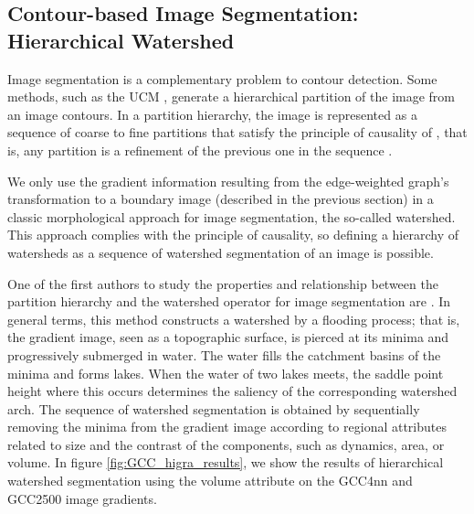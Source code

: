 \subsection{Contour-based Image Segmentation: Hierarchical Watershed}

Image segmentation is a complementary problem to contour detection. Some methods, such as the UCM \citep{Arbelaez.Maire.ea:PR:2009}, generate a hierarchical partition of the image from an image contours. In a partition hierarchy, the image is represented as a sequence of coarse to fine partitions that satisfy the principle of causality of \cite{Koenderink:BC:1984}, that is, any partition is a refinement of the previous one in the sequence \citep{Perret.Cousty.ea:TIP:2018}.

We only use the gradient information resulting from the edge-weighted graph's transformation to a boundary image (described in the previous section) in a classic morphological approach for image segmentation, the so-called watershed. This approach complies with the principle of causality, so defining a hierarchy of watersheds as a sequence of watershed segmentation of an image is possible. 

One of the first authors to study the properties and relationship between the partition hierarchy and the watershed operator for image segmentation are \citep{Najman.Schmitt:PAMI:1996}. In general terms, this method constructs a watershed by a flooding process; that is, the gradient image, seen as a topographic surface, is pierced at its minima and progressively submerged in water. The water fills the catchment basins of the minima and forms lakes. When the water of two lakes meets, the saddle point height where this occurs determines the saliency of the corresponding watershed arch. The sequence of watershed segmentation is obtained by sequentially removing the minima from the gradient image according to regional attributes related to size and the contrast of the components, such as dynamics, area, or volume. In figure \ref{fig:GCC_higra_results}, we show the results of hierarchical watershed segmentation using the volume attribute on the GCC4nn and GCC2500 image gradients. 

